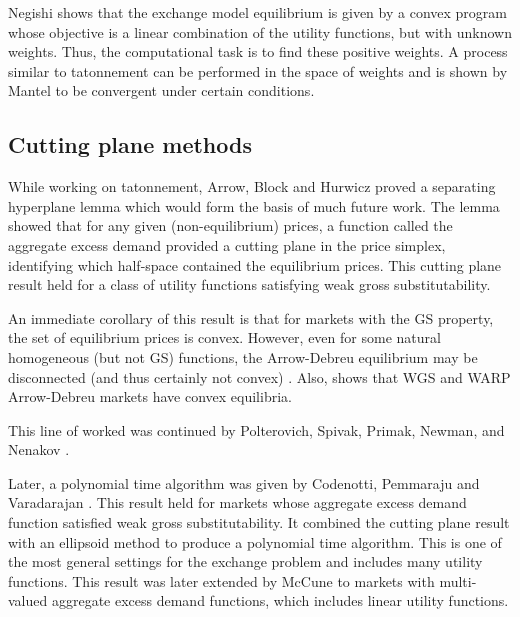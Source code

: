 \documentclass{article}
\begin{document}
Negishi \cite{negishi1960welfare} shows that the exchange model equilibrium is given by a convex program whose objective is a linear combination of the utility functions, but with unknown weights. Thus, the computational task is to find these positive weights. A process similar to tatonnement can be performed in the space of weights and is shown by Mantel \cite{mantel1971welfare} to be convergent under certain conditions.

\subsection{Cutting plane methods}
While working on tatonnement, Arrow, Block and Hurwicz \cite{arrow1959stability} proved a separating hyperplane lemma which would form the basis of much future work. The lemma showed that for any given (non-equilibrium) prices, a function called the aggregate excess demand provided a cutting plane in the price simplex, identifying which half-space contained the equilibrium prices.
This cutting plane result held for a class of utility functions satisfying weak gross substitutability.

An immediate corollary of this result is that for markets with the GS property, the set of equilibrium prices is convex.  
However, even for some natural homogeneous (but not GS) functions, the Arrow-Debreu equilibrium may be disconnected (and thus certainly not convex) \cite{gjerstad1996multiple}. Also, \cite[p.~608]{mas1995microeconomic} shows that WGS and WARP Arrow-Debreu markets have convex equilibria.

This line of worked was continued by Polterovich, Spivak, Primak, Newman, and Nenakov \cite{nenakov1983algorithm,newman1992complexity,primak1984algorithm,primak1993converging}.

Later, a polynomial time algorithm was given by Codenotti, Pemmaraju and Varadarajan \cite{codenotti2005polynomial}. This result held for markets whose aggregate excess demand function satisfied weak gross substitutability. It combined the cutting plane result with an ellipsoid method to produce a polynomial time algorithm. This is one of the most general settings for the exchange problem and includes many utility functions. This result was later extended by McCune \cite{mccune2007extending} to markets with multi-valued aggregate excess demand functions, which includes linear utility functions.
\end{document}

